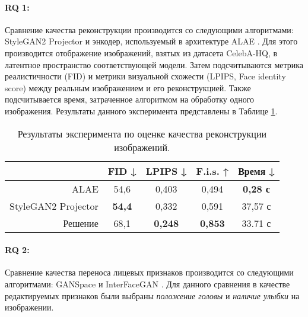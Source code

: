 \paragraph{RQ 1:}
Сравнение качества реконструкции производится со следующими алгоритмами: StyleGAN2 Projector \cite{karras2020stylegan2} и энкодер, используемый в архитектуре ALAE \cite{ALAE}.
Для этого производится отображение изображений, взятых из датасета CelebA-HQ, в латентное пространство соответствующей модели.
Затем подсчитываются метрика реалистичности (FID) и метрики визуальной схожести (LPIPS, Face identity score) между реальным изображением и его реконструкцией.
Также подсчитывается время, затраченное алгоритмом на обработку одного изображения.
Результаты данного эксперимента представлены в Таблице \ref{tab:exp1}.

\begin{table}
\begin{center}
  \caption{Результаты эксперимента по оценке качества реконструкции изображений.}
  \label{tab:exp1}
  \begin{tabular}{ |r|c|c|c|c| } 
    \hline
      & FID ↓ & LPIPS ↓ & F.i.s. ↑ & Время ↓ \\ 
    \hline\hline
    ALAE    & 54,6 & 0,403 & 0,494 & \textbf{0,28 с}  \\ 
    StyleGAN2 Projector 
            & \textbf{54,4} & 0,332 & 0,591 & 37,57 с  \\ 
    Решение & 68,1 & \textbf{0,248} & \textbf{0,853} & 33.71 с  \\ 
    \hline
  \end{tabular}
\end{center}
\end{table}

\paragraph{RQ 2:}
Сравнение качества переноса лицевых признаков производится со следующими алгоритмами: GANSpace \cite{hrknen2020ganspace} и InterFaceGAN \cite{shen2020interfacegan}.
Для данного сравнения в качестве редактируемых признаков были выбраны \emph{положение головы} и \emph{наличие улыбки} на изображении.

